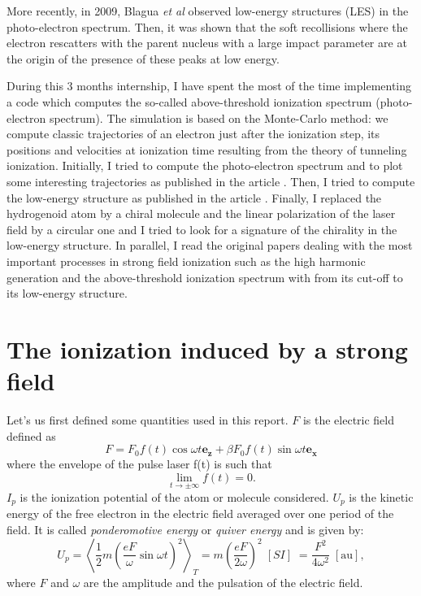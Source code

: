 \documentclass[a4paper]{article}
\begin{document}
\par
More recently, in 2009, Blagua \textit{et al} \cite{Blaga_2009, Quan_2009} observed low-energy structures (LES) in the photo-electron spectrum. Then, it was shown \cite{Faisal_2009,Liu_2010,Yan_2010,Liu_2011,Kastner_2012_soft} that the soft recollisions where the electron rescatters with the parent nucleus with a large impact parameter are at the origin of the presence of these peaks at low energy.
\par
During this 3 months internship, I have spent the most of the time implementing a code which computes the so-called above-threshold ionization spectrum (photo-electron spectrum). The simulation is based on the Monte-Carlo method: we compute classic trajectories of an electron just after the ionization step, its positions and velocities at ionization time resulting from the theory of tunneling ionization. 
Initially, I tried to compute the photo-electron spectrum and to plot some interesting trajectories as published in the article \cite{Hu_1997}. 
Then, I tried to compute the low-energy structure as published in the article \cite{Kastner_2012_pulse}.
Finally, I replaced the hydrogenoid atom by a chiral molecule and the linear polarization of the laser field by a circular one and I tried to look for a signature of the chirality in the low-energy structure.
In parallel, I read the original papers dealing with the most important processes in strong field ionization such as the high harmonic generation and the above-threshold ionization spectrum with from its cut-off to its low-energy structure.


\section{The ionization induced by a strong field}
Let's us first defined some quantities used in this report. $F$ is the electric field defined as
\begin{equation}
\label{electric_field}
F=F_{0} f(t)\cos{\omega t} \mathbf{e_{z}} + \beta F_{0} f(t)\sin{\omega t} \mathbf{e_{x}}
\end{equation}
where the envelope of the pulse laser f(t) is such that
\begin{equation}
\label{envelope}
 \lim_{t\to\pm\infty} f(t)=0.
\end{equation}
$I_{p}$ is the ionization potential of the atom or molecule considered. $U_{p}$ is the kinetic energy of the free electron in the electric field averaged over one period of the field. It is called \textit{ponderomotive energy} or \textit{quiver energy} and is given by:
\begin{equation}
U_{p}=\left< \frac{1}{2}m \left(\frac{eF}{\omega}\sin{\omega t} \right)^{2} \right>_{T} = m \left( \frac{eF}{2\omega} \right)^{2} \; [SI] \; = \frac{F^{2}}{4\omega^{2}} \; [\text{au}],
\end{equation}  
where $F$ and $\omega$ are the amplitude and the pulsation of the electric field.
\end{document}
